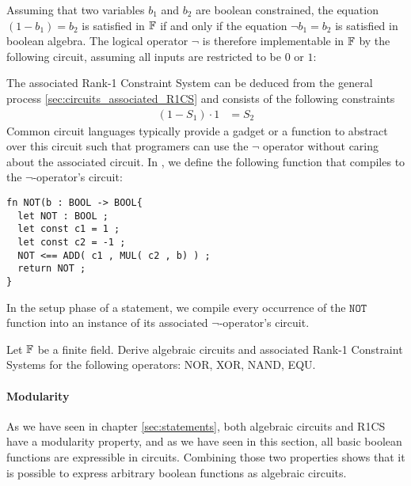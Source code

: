 Assuming that two variables $b_1$ and $b_2$ are boolean constrained, the equation $(1-b_1) = b_2$ is satisfied in $\mathbb{F}$ if and only if the equation $\lnot b_1 = b_2$ is satisfied in boolean algebra. The logical operator $\lnot$ is therefore implementable in $\mathbb{F}$ by the following circuit, assuming all inputs are restricted to be $0$ or $1$:
\begin{center}
\end{center}
The associated Rank-1 Constraint System can be deduced from the general process \ref{sec:circuits_associated_R1CS} and consists of the following constraints
\begin{align*}
  (1-S_1)\cdot 1 &= S_2
\end{align*}
Common circuit languages typically provide a gadget or a function to abstract over this circuit such that programers can use the $\lnot$ operator without caring about the associated circuit. In , we define the following function that compiles to the $\lnot$-operator's circuit:
\begin{lstlisting}
fn NOT(b : BOOL -> BOOL{
  let NOT : BOOL ;
  let const c1 = 1 ;
  let const c2 = -1 ;
  NOT <== ADD( c1 , MUL( c2 , b) ) ;
  return NOT ;
}
\end{lstlisting}
In the setup phase of a statement, we compile every occurrence of the $\mathtt{NOT}$ function into an instance of its associated $\lnot$-operator's circuit.
\begin{exercise}
Let $\mathbb{F}$ be a finite field. Derive algebraic circuits and associated Rank-1 Constraint Systems for the following operators: NOR, XOR, NAND, EQU.
\end{exercise}
\paragraph{Modularity} As we have seen in chapter \ref{sec:statements}, both algebraic circuits and R1CS have a modularity property, and as we have seen in this section, all basic boolean functions are expressible in circuits. Combining those two properties shows that it is possible to express arbitrary boolean functions as algebraic circuits.

